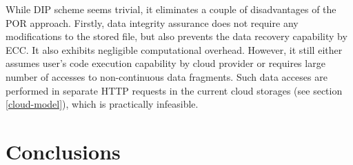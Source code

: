 While DIP scheme seems trivial, it eliminates a couple of disadvantages of the
POR approach. Firstly, data integrity assurance does not require any
modifications to the stored file, but also prevents the data recovery
capability by ECC. It also exhibits negligible computational overhead.
However, it still either assumes user's code execution capability by cloud
provider or requires large number of accesses to non-continuous data fragments.
Such data acceses are performed in separate HTTP requests in the current
cloud storages (see section \ref{cloud-model}), which is practically
infeasible.\\ 

	\section{Conclusions}
